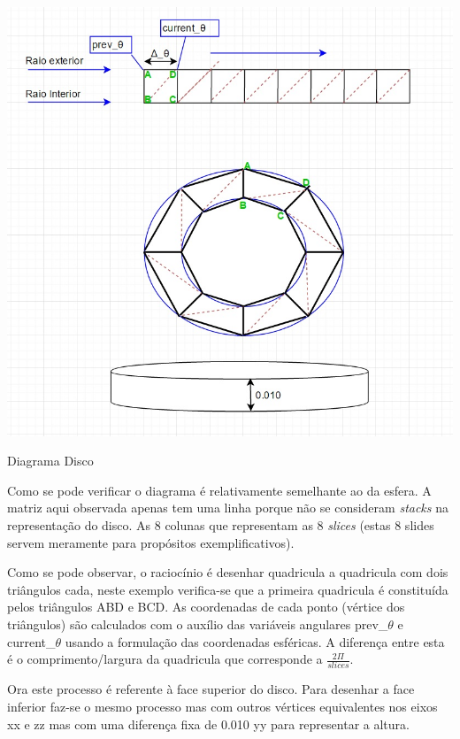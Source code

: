 \begin{center}
 	
 	\includegraphics[width=\textwidth,height=\textheight,keepaspectratio]{resources/disco.jpg}
 	\captionsetup{type=figure, width=0.8\linewidth}
	\caption{Diagrama Disco}
\label{fig:ssec1:disc} 
\end{center}

Como se pode verificar o diagrama é relativamente semelhante ao da esfera. A matriz aqui observada apenas tem uma linha porque não se consideram \textit{stacks} na representação do disco. As 8 colunas que representam as 8 \textit{slices} (estas 8 slides servem meramente para propósitos exemplificativos). 

Como se pode observar, o raciocínio é desenhar quadricula a quadricula com dois triângulos cada, neste exemplo verifica-se que a primeira quadricula é constituída pelos triângulos ABD e BCD. As coordenadas de cada ponto (vértice dos triângulos) são calculados com o auxílio das variáveis angulares prev\_$\theta $ e current\_$\theta$ usando a formulação das coordenadas esféricas. A diferença entre esta é o comprimento/largura da quadricula que corresponde a \( \frac{2\Pi}{slices} \). 

Ora este processo é referente à face superior do disco. Para desenhar a face inferior faz-se o mesmo processo mas com outros vértices equivalentes nos eixos xx e zz mas com uma diferença fixa de 0.010 yy para representar a altura.

